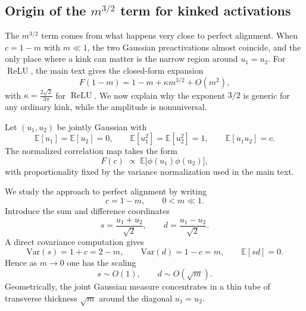 \documentclass{article}
\DeclareMathOperator{\ReLU}{ReLU}
\newcommand{\relu}{\ensuremath{\ReLU}}
\theoremstyle{plain}
\theoremstyle{definition}
\theoremstyle{remark}
\begin{document}
\subsection{Origin of the $m^{3/2}$ term for kinked activations}
\label{app:tube_argument_kink}

The \(m^{3/2}\) term comes from what happens very close to perfect alignment. When \(c=1-m\) with \(m\ll 1\), the two Gaussian preactivations almost coincide, and the only place where a kink can matter is the narrow region around \(u_1=u_2\). For \relu{}, the main text gives the closed-form expansion
\relax
\begin{equation}
F(1-m)=1-m+\kappa m^{3/2}+O(m^{2}),
\end{equation}
\relax
with $\kappa=\frac{2\sqrt{2}}{3\pi}$ for \relu{}. We now explain why the exponent $3/2$ is generic for any ordinary kink, while the amplitude is nonuniversal.

Let $(u_{1},u_{2})$ be jointly Gaussian with
\relax
\begin{equation}
\mathbb{E}[u_{1}]=\mathbb{E}[u_{2}]=0, \qquad \mathbb{E}[u_{1}^{2}]=\mathbb{E}[u_{2}^{2}]=1, \qquad \mathbb{E}[u_{1}u_{2}]=c.
\end{equation}
\relax
The normalized correlation map takes the form
\relax
\begin{equation}
F(c)\;\propto\;\mathbb{E}\big[\phi(u_{1})\phi(u_{2})\big],
\end{equation}
\relax
with proportionality fixed by the variance normalization used in the main text.

We study the approach to perfect alignment by writing
\relax
\begin{equation}
c=1-m, \qquad 0<m\ll 1.
\end{equation}
\relax
Introduce the sum and difference coordinates
\relax
\begin{equation}
s=\frac{u_{1}+u_{2}}{\sqrt{2}}, \qquad d=\frac{u_{1}-u_{2}}{\sqrt{2}}.
\end{equation}
\relax
A direct covariance computation gives
\relax
\begin{equation}
\mathrm{Var}(s)=1+c=2-m, \qquad \mathrm{Var}(d)=1-c=m, \qquad \mathbb{E}[sd]=0.
\end{equation}
\relax
Hence as $m\to 0$ one has the scaling
\relax
\begin{equation}
s\sim O(1), \qquad d\sim O(\sqrt{m}).
\end{equation}
\relax
Geometrically, the joint Gaussian measure concentrates in a thin tube of transverse thickness $\sqrt{m}$ around the diagonal $u_{1}=u_{2}$.
\end{document}
